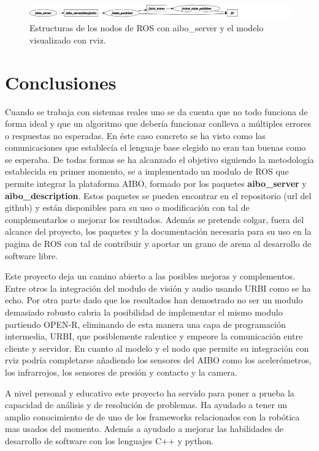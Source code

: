 \documentclass[12pt,a4paper,final,twoside]{article}
\begin{document}
\begin{figure}[H]
	\centering
    \includegraphics[scale=0.26]{images/graphModel.pdf}
	 \caption{Estructuras de los nodos de ROS con aibo{\_}server y el modelo visualizado con rviz.}
  \label{fig:aibostack}
\end{figure}

\newpage
\section*{Conclusiones}


Cuando se trabaja con sistemas reales uno se da cuenta que no todo funciona de forma ideal y que un algoritmo que debería funcionar conlleva a múltiples errores o respuestas no esperadas. En éste caso concreto se ha visto como las comunicaciones que establecía el lenguaje base elegido no eran tan buenas como se esperaba. De todas formas se ha alcanzado el objetivo siguiendo la metodología establecida en primer momento, se a implementado un modulo de ROS que permite integrar la plataforma AIBO, formado por los paquetes \textbf{aibo{\_}server} y \textbf{aibo{\_}description}. Estos paquetes se pueden encontrar en el repositorio (url del github) y están disponibles para su uso o modificación con tal de complementarlos o mejorar los resultados. Además se pretende colgar, fuera del alcance del proyecto, los paquetes y la documentación necesaria para su uso en la pagina de ROS con tal de contribuir y aportar un grano de arena al desarrollo de software libre.

Este proyecto deja un camino abierto a las posibles mejoras y complementos. Entre otros la integración del modulo de visión y audio usando URBI como se ha echo. Por otra parte dado que los resultados han demostrado no ser un modulo demasiado robusto cabria la posibilidad de implementar el mismo modulo partiendo OPEN-R, eliminando de esta manera una capa de programación intermedia, URBI, que posiblemente ralentice y empeore la comunicación entre cliente y servidor. En cuanto al modelo y el nodo que permite su integración con rviz podría completarse añadiendo los sensores del AIBO como los acelerómetros, los infrarrojos, los sensores de presión y contacto y la camera.

A nivel personal y educativo este proyecto ha servido para poner a prueba la capacidad de análisis y de resolución de problemas. Ha ayudado a tener un amplio conocimiento de de uno de los frameworks relacionados con la robótica mas usados del momento. Además a ayudado a mejorar las habilidades de desarrollo de software con los lenguajes C++ y python. 
\end{document}
